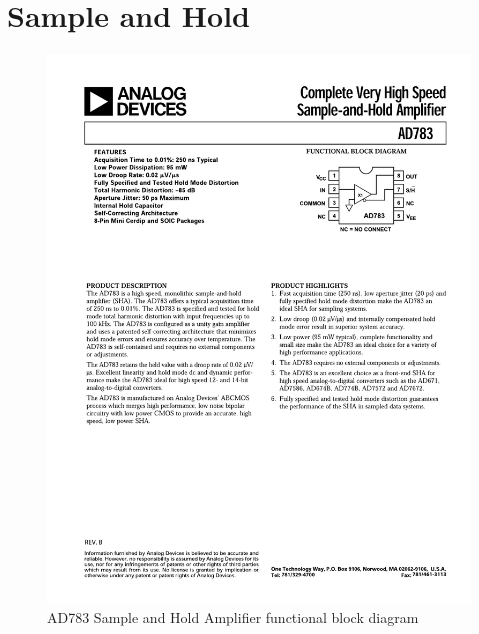\section{Sample and Hold}
\begin{figure}[htbp]
	\centering
	\includegraphics[width=.8\textwidth]{Figures/3_sample_hold_ad783.pdf}
	\caption[AD783 Sample and Hold amplifier block diagram]{AD783 Sample and Hold Amplifier functional block diagram \cite{AD783}}
	\label{fig:3_sha_block}
\end{figure}

